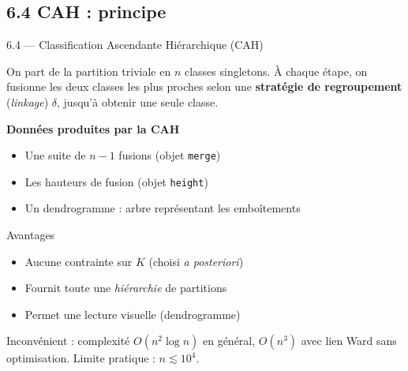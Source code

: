 \subsection{6.4 CAH : principe}
\begin{frame}{6.4 — Classification Ascendante Hiérarchique (CAH)}
\begin{definition}
On part de la partition triviale en $n$ classes singletons.
À chaque étape, on \alert{fusionne} les deux classes les plus proches selon
une \textbf{stratégie de regroupement} (\emph{linkage}) $\delta$, jusqu'à obtenir
une seule classe.
\end{definition}

\textbf{Données produites par la CAH}
\begin{itemize}\small
  \item Une suite de $n-1$ \alert{fusions} (objet \texttt{merge})
  \item Les \alert{hauteurs} de fusion (objet \texttt{height})
  \item Un \alert{dendrogramme} : arbre représentant les emboîtements
\end{itemize}

\begin{block}{Avantages}
\begin{itemize}\small
  \item Aucune contrainte sur $K$ (choisi \emph{a posteriori})
  \item Fournit toute une \emph{hiérarchie} de partitions
  \item Permet une \alert{lecture visuelle} (dendrogramme)
\end{itemize}
\end{block}

\begin{rema}
\small Inconvénient : complexité $O(n^2 \log n)$ en général, $O(n^3)$ avec lien Ward sans optimisation.
Limite pratique : $n \lesssim 10^4$.
\end{rema}
\end{frame}

